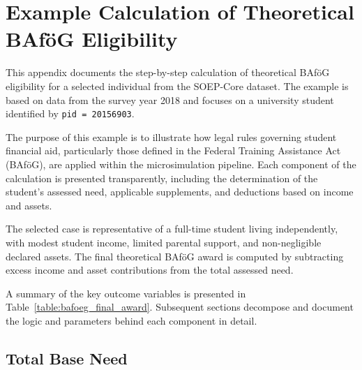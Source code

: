 

\newpage
\section{Example Calculation of Theoretical BAföG Eligibility}
\label{appendix:example_calculation}

This appendix documents the step-by-step calculation of theoretical BAföG eligibility for a selected individual from the SOEP-Core dataset. The example is based on data from the survey year 2018 and focuses on a university student identified by \texttt{pid = 20156903}.

The purpose of this example is to illustrate how legal rules governing student financial aid, particularly those defined in the Federal Training Assistance Act (BAföG), are applied within the microsimulation pipeline. Each component of the calculation is presented transparently, including the determination of the student's assessed need, applicable supplements, and deductions based on income and assets.

The selected case is representative of a full-time student living independently, with modest student income, limited parental support, and non-negligible declared assets. The final theoretical BAföG award is computed by subtracting excess income and asset contributions from the total assessed need.

A summary of the key outcome variables is presented in Table~\ref{table:bafoeg_final_award}. Subsequent sections decompose and document the logic and parameters behind each component in detail.





\subsection{Total Base Need}
